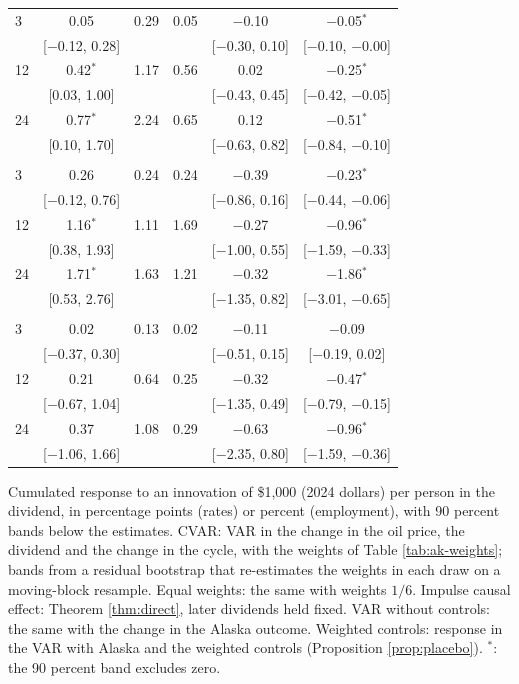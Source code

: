 \begin{table}[htbp]
\begin{tabular}{lccccc}
3 & 0.05 & 0.29 & 0.05 & $-$0.10 & $-$0.05$^{*}$ \\
 & [$-$0.12, 0.28] & & & [$-$0.30, 0.10] & [$-$0.10, $-$0.00] \\
12 & 0.42$^{*}$ & 1.17 & 0.56 & 0.02 & $-$0.25$^{*}$ \\
 & [0.03, 1.00] & & & [$-$0.43, 0.45] & [$-$0.42, $-$0.05] \\
24 & 0.77$^{*}$ & 2.24 & 0.65 & 0.12 & $-$0.51$^{*}$ \\
 & [0.10, 1.70] & & & [$-$0.63, 0.82] & [$-$0.84, $-$0.10] \\
\addlinespace
\multicolumn{6}{l}{Leisure and hospitality} \\
3 & 0.26 & 0.24 & 0.24 & $-$0.39 & $-$0.23$^{*}$ \\
 & [$-$0.12, 0.76] & & & [$-$0.86, 0.16] & [$-$0.44, $-$0.06] \\
12 & 1.16$^{*}$ & 1.11 & 1.69 & $-$0.27 & $-$0.96$^{*}$ \\
 & [0.38, 1.93] & & & [$-$1.00, 0.55] & [$-$1.59, $-$0.33] \\
24 & 1.71$^{*}$ & 1.63 & 1.21 & $-$0.32 & $-$1.86$^{*}$ \\
 & [0.53, 2.76] & & & [$-$1.35, 0.82] & [$-$3.01, $-$0.65] \\
\addlinespace
\multicolumn{6}{l}{Retail trade} \\
3 & 0.02 & 0.13 & 0.02 & $-$0.11 & $-$0.09 \\
 & [$-$0.37, 0.30] & & & [$-$0.51, 0.15] & [$-$0.19, 0.02] \\
12 & 0.21 & 0.64 & 0.25 & $-$0.32 & $-$0.47$^{*}$ \\
 & [$-$0.67, 1.04] & & & [$-$1.35, 0.49] & [$-$0.79, $-$0.15] \\
24 & 0.37 & 1.08 & 0.29 & $-$0.63 & $-$0.96$^{*}$ \\
 & [$-$1.06, 1.66] & & & [$-$2.35, 0.80] & [$-$1.59, $-$0.36] \\
\bottomrule
\end{tabular}
\par\smallskip\parbox{0.95\textwidth}{\footnotesize Cumulated response to an innovation of \$1,000 (2024 dollars) per person in the dividend, in percentage points (rates) or percent (employment), with 90 percent bands below the estimates. CVAR: VAR in the change in the oil price, the dividend and the change in the cycle, with the weights of Table \ref{tab:ak-weights}; bands from a residual bootstrap that re-estimates the weights in each draw on a moving-block resample. Equal weights: the same with weights $1/6$. Impulse causal effect: Theorem \ref{thm:direct}, later dividends held fixed. VAR without controls: the same with the change in the Alaska outcome. Weighted controls: response in the VAR with Alaska and the weighted controls (Proposition \ref{prop:placebo}). $^{*}$: the 90 percent band excludes zero.}
\end{table}
